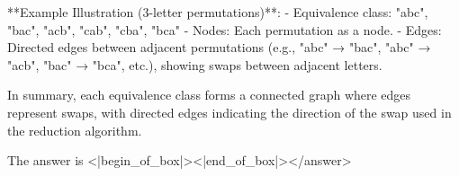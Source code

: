 **Example Illustration (3-letter permutations)**:  
- Equivalence class: { "abc", "bac", "acb", "cab", "cba", "bca" }  
- Nodes: Each permutation as a node.  
- Edges: Directed edges between adjacent permutations (e.g., "abc" → "bac", "abc" → "acb", "bac" → "bca", etc.), showing swaps between adjacent letters.  

In summary, each equivalence class forms a connected graph where edges represent swaps, with directed edges indicating the direction of the swap used in the reduction algorithm.  

The answer is <|begin_of_box|><|end_of_box|></answer>